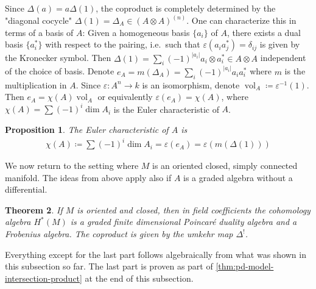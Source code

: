 \documentclass{scrartcl}
\theoremstyle{plain}
\newtheorem{theorem}{Theorem}[section]
\newtheorem{proposition}[theorem]{Proposition}
\theoremstyle{definition}
\renewcommand{\epsilon}{\varepsilon}
\newcommand{\abs}[1]{\left\lvert#1\right\rvert}
\DeclareMathOperator{\vol}{vol}
\newcommand{\quiso}{\simeq}
\newcommand{\defeq}{\coloneqq}
\let\xto\xrightarrow
\let\xfrom\xleftarrow
\begin{document}
Since $\Delta(a) = a\Delta(1)$, the coproduct is completely determined by the "diagonal cocycle" $\Delta(1)=\Delta_A\in (A\otimes A)^{(n)}$. One can characterize this in terms of a basis of $A$: Given a homogeneous basis $\{a_i\}$ of $A$, there  exists a dual basis $\{a_i^*\}$ with respect to the pairing, i.e.\ such that $\epsilon(a_i a_j^*) = \delta_{ij}$ is given by the Kronecker symbol. Then $\Delta(1) = \sum_i (-1)^{\abs{a_i}} a_i \otimes a_i^*\in A\otimes A$ independent of the choice of basis. Denote $e_A = m(\Delta_A) = \sum_i (-1)^{\abs{a_i}} a_i a_i^*$ where $m$ is the multiplication in $A$. Since $\epsilon\colon A^n\to k$ is an isomorphism, denote $\vol_A\defeq \epsilon^{-1}(1)$. Then $e_A = \chi(A) \vol_A$ or equivalently $\epsilon(e_A) = \chi(A)$, where $\chi(A) = \sum (-1)^i\dim A_i$ is the Euler characteristic of $A$. 

\begin{proposition}
    The Euler characteristic of $A$ is
    \begin{align*}
        \chi(A) \defeq \sum (-1)^i\dim A_i = \epsilon(e_A) = \epsilon(m(\Delta(1)))
    \end{align*}
\end{proposition}




We now return to the setting where $M$ is an oriented closed, simply connected manifold. The ideas from above apply also if $A$ is a graded algebra without a differential. 
\begin{theorem}
    If $M$ is oriented and closed, then in  field coefficients the cohomology algebra $H^*(M)$ is a graded finite dimensional Poincaré duality algebra and a Frobenius algebra. The coproduct is given by the umkehr map $\Delta^!$.
\end{theorem} 
Everything except for the last part follows algebraically from what was shown in this subsection so far. The last part is proven as part of \cref{thm:pd-model-intersection-product} at the end of this subsection.
\end{document}
